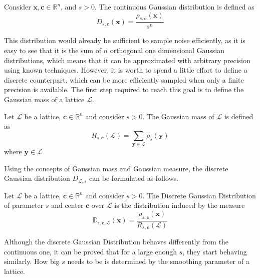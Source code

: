 \begin{definition}
Consider $\mathbf{x},\mathbf{c}\in\mathbb{R}^n$, and $s>0$. The continuous Gaussian distribution is defined as
\begin{equation*}
D_{s,\mathbf{c}}(\mathbf{x})=\frac{\rho_{s,\mathbf{c}}(\mathbf{x})}{s^n}
\end{equation*}
\end{definition}

This distribution would already be sufficient to sample noise efficiently, as it is easy to see that it is the sum of $n$ orthogonal one dimensional Gaussian distributions, which means that it can be approximated with arbitrary precision using known techniques. However, it is worth to spend a little effort to define a discrete counterpart, which can be more efficiently sampled when only a finite precision is available. The first step required to reach this goal is to define the Gaussian mass of a lattice $\mathscr{L}$.

\begin{definition}
Let $\mathscr{L}$ be a lattice, $\mathbf{c}\in\mathbb{R}^n$ and consider $s>0$. The Gaussian mass of $\mathscr{L}$ is defined as
\begin{equation*}
R_{s,\mathbf{c}}(\mathscr{L})=\sum_{\mathbf{y}\in\mathscr{L}}\rho_s(\mathbf{y})
\end{equation*}
where $\mathbf{y}\in\mathscr{L}$
\end{definition}

Using the concepts of Gaussian mass and Gaussian measure, the discrete Gaussian distribution $D_{\mathscr{L},s}$ can be formulated as follows.

\begin{definition}
Let $\mathscr{L}$ be a lattice, $\mathbf{c}\in\mathbb{R}^n$ and consider $s>0$. The Discrete Gaussian Distribution of parameter $s$ and center $\mathbf{c}$ over $\mathscr{L}$ is the distribution induced by the measure
\begin{equation*}
\mathbb{D_{s,\mathbf{c},\mathscr{L}}}(\mathbf{x})= \frac{\rho_{s,\mathbf{c}}(\mathbf{x})}{R_{s,\mathbf{c}}(\mathscr{L})}
\end{equation*}
\end{definition}

\begin{remark}
Although the discrete Gaussian Distribution behaves differently from the continuous one, it can be proved that for a large enough $s$, they start behaving similarly. How big $s$ needs to be is determined by the smoothing parameter of a lattice.
\end{remark}

